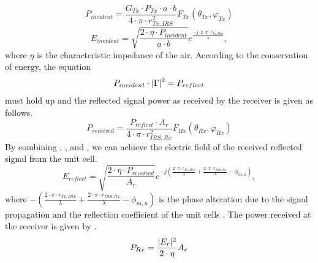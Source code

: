 \begin{equation} \label{Eq:model3-pinc}
		P_{incident} = \frac{G_{Tx} \cdot P_{Tx} \cdot a \cdot b}{4\cdot \pi \cdot r_{Tx, IRS}^2} F_{Tx}(\theta_{Tx},\varphi_{Tx}) 
\end{equation}
\begin{equation}		
		E_{incident}= \sqrt{\frac{2 \cdot \eta \cdot P_{incident}}{a \cdot b}} e^{\frac{-j \cdot 2 \cdot \pi \cdot r_{Tx, IRS}}{\lambda}},
\end{equation}
where $\eta$ is the characteristic impedance of the air. According to the conservation of energy, the equation  
\begin{equation} \label{Eq:model3-conserv}
	P_{incident}\cdot |\Gamma|^2 = P_{reflect} \\ 
\end{equation}
must hold up and the reflected signal power as received by the receiver is given as follows.
\begin{equation} \label{Eq:model3-Preflect}
	P_{received}= \frac{P_{reflect} \cdot A_r}{4\cdot \pi \cdot r_{IRS,Rx}^2} F_{Rx}(\theta_{Rx},\varphi_{Rx}) 
\end{equation}
By combining , , and , we can achieve the electric field of the received reflected signal from the unit cell. 
\begin{equation}
	E_{reflect}= \sqrt{\frac{2 \cdot \eta \cdot P_{received}}{A_r}} e^{-j \left( {\frac{2 \cdot \pi \cdot r_{Tx,IRS}}{\lambda}+\frac{2 \cdot \pi \cdot r_{IRS,Rx}}{\lambda}-\phi_{m,n}} \right) },
\end{equation}
where $-({\frac{2 \cdot \pi \cdot r_{Tx, IRS}}{\lambda}+\frac{2 \cdot \pi \cdot r_{IRS, Rx}}{\lambda}-\phi_{m,n}})$ is the phase alteration due to the signal propagation and the reflection coefficient of the unit cells \cite{tang2020wireless}. The power received at the receiver is given by  .
\begin{equation} \label{Eq:model3-pr}
		P_{Rx} = \frac{|E_{r}|^2}{2\cdot \eta} A_r \\
\end{equation}
